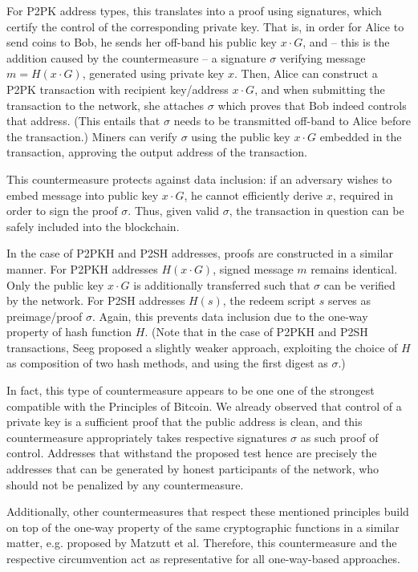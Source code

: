 \documentclass[a4paper,11pt,titlepage]{scrbook}
\begin{document}
For P2PK address types, this translates into a proof using signatures, which certify the control of the corresponding private key.
That is, in order for Alice to send coins to Bob, he sends her off-band his public key $x\cdot G$, and – this is the addition caused by the countermeasure – a signature $\sigma$ verifying message $m=H(x\cdot G)$, generated using private key $x$.
Then, Alice can construct a P2PK transaction with recipient key/address $x\cdot G$, and when submitting the transaction to the network, she attaches $\sigma$ which proves that Bob indeed controls that address. 
(This entails that $\sigma$ needs to be transmitted off-band to Alice before the transaction.)
Miners can verify $\sigma$ using the public key $x\cdot G$ embedded in the transaction, approving the output address of the transaction.

This countermeasure protects against data inclusion: if an adversary wishes to embed message into public key $x\cdot G$, he cannot efficiently derive $x$, required in order to sign the proof $\sigma$.
Thus, given valid $\sigma$, the transaction in question can be safely included into the blockchain.

In the case of P2PKH and P2SH addresses, proofs are constructed in a similar manner.
For P2PKH addresses $H(x\cdot G)$, signed message $m$ remains identical.
Only the public key $x\cdot G$ is additionally transferred such that $\sigma$ can be verified by the network.
For P2SH addresses $H(s)$, the redeem script $s$ serves as preimage/proof $\sigma$.
Again, this prevents data inclusion due to the one-way property of hash function $H$.
(Note that in the case of P2PKH and P2SH transactions, Seeg proposed a slightly weaker approach, exploiting the choice of $H$ as composition of two hash methods, and using the first digest as $\sigma$.)

In fact, this type of countermeasure appears to be one one of the strongest compatible with the Principles of Bitcoin.
We already observed that control of a private key is a sufficient proof that the public address is clean,
and this countermeasure appropriately takes respective signatures $\sigma$ as such proof of control.
Addresses that withstand the proposed test hence are precisely the addresses that can be generated by honest participants of the network, who should not be penalized by any countermeasure.

Additionally, other countermeasures that respect these mentioned principles build on top of the one-way property of the same cryptographic functions in a similar matter, e.g.\@ {} proposed by Matzutt et al.
Therefore, this countermeasure and the respective circumvention act as representative for all one-way-based approaches.
\end{document}

